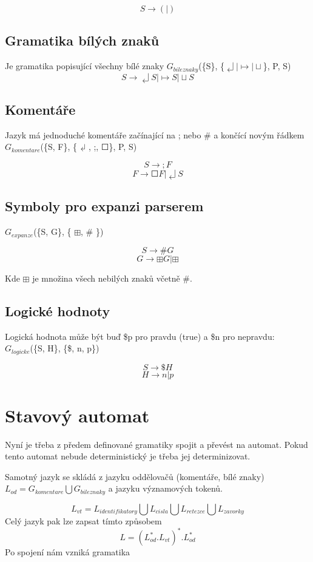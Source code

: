 \documentclass[a4paper,11pt]{article}
\begin{document}
$$S \rightarrow (|)$$

\subsection{Gramatika bílých znaků}
Je gramatika popisující všechny bílé znaky $G_{bileznaky}$(\{S\}, \{$\dlsh | \mapsto | \sqcup$\}, P, S)
$$S \rightarrow  \dlsh S | \mapsto S | \sqcup S$$

\subsection{Komentáře}
Jazyk má jednoduché komentáře začínající na ; nebo \# a končící novým řádkem $G_{komentare}$(\{S, F\}, \{$\dlsh$, ;, $\Square$\}, P, S)

$$S \rightarrow ;F $$
$$F \rightarrow \Square F | \dlsh S$$

\subsection{Symboly pro expanzi parserem}

$G_{expanze}$(\{S, G\}, \{ $\boxplus$, \# \})

$$S \rightarrow \#G$$
$$G \rightarrow \boxplus G | \boxplus$$

Kde $\boxplus$ je množina všech nebilých znaků včetně \#. 

\subsection{Logické hodnoty}
Logická hodnota může být buď \$p pro pravdu (true) a \$n pro nepravdu:
\\
$G_{logicke}$(\{S, H\}, \{\$, n, p\})

$$S \rightarrow \$H$$
$$H \rightarrow n | p$$

\section{Stavový automat}
Nyní je třeba z předem definované gramatiky spojit a převést na automat. Pokud tento automat nebude deterministický je třeba jej determinizovat.

Samotný jazyk se skládá z jazyku oddělovačů (komentáře, bílé znaky) $L_{od} = G_{komentare} \bigcup G_{bileznaky}$ a jazyku významových tokenů. 

$$L_{vt} = L_{identifikatory} \bigcup L_{cisla} \bigcup L_{retezce} \bigcup L_{zavorky}$$
Celý jazyk pak lze zapsat tímto způsobem 
$$L = (L^{*}_{od}.L_{vt})^{*}.L^{*}_{od}$$
Po spojení nám vzniká gramatika
 
\end{document}
